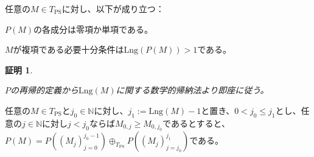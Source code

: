 \documentclass[dvipdfmx,uplatex]{jsarticle}
\theoremstyle{customnonumberbreakfortheorem}
\theoremstyle{customnonumberbreakforproof}
\newtheorem{hideableproof}{証明}
\begin{document}
\begin{proposition}[\(P\)の各成分の非複項性]\label{Pの各成分の非複項性}
	任意の\(M \in T_{\textrm{PS}}\)に対し、以下が成り立つ：
	\begin{penumerate}
		\item \(P(M)\)の各成分は零項か単項である。
		\item \(M\)が複項である必要十分条件は\(\textrm{Lng}(P(M)) > 1\)である。
	\end{penumerate}
\end{proposition}

\begin{hideableproof}
	\begin{indented}
		\item \(P\)の再帰的定義から\(\textrm{Lng}(M)\)に関する数学的帰納法より即座に従う。
	\end{indented}
\end{hideableproof}

\begin{proposition}[\(P\)の加法性]\label{Pの加法性}
	任意の\(M \in T_{\textrm{PS}}\)と\(j_0 \in \mathbb{N}\)に対し、\(j_1 := \textrm{Lng}(M)-1\)と置き、\(0 < j_0 \leq j_1\)とし、任意の\(j \in \mathbb{N}\)に対し\(j < j_0\)ならば\(M_{0,j} \geq M_{0,j_0}\)であるとすると、\(P(M) = P((M_j)_{j=0}^{j_0-1}) \oplus_{T_{\textrm{PS}}} P((M_j)_{j=j_0}^{j_1})\)である。
\end{proposition}
\end{document}
